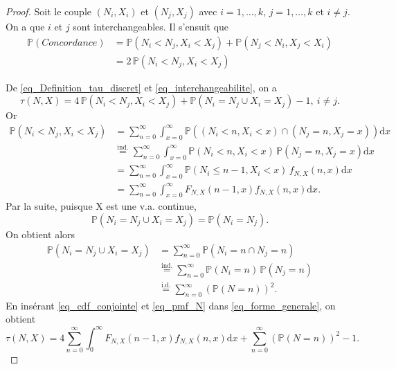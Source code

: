 \documentclass{article}
\begin{document}
	\begin{proof}
		Soit le couple $(N_i, X_i)$ et $(N_j, X_j)$ avec $i=1,\dots,k$, $j=1,\dots,k$ et $i\neq j$. On a que $i$ et $j$ sont interchangeables. Il s'ensuit que
		\begin{align}
			\mathbb{P}(Concordance) 
			&= \mathbb{P}(N_i < N_j, X_i < X_j) + \mathbb{P}(N_j < N_i, X_j < X_i) \nonumber \\
			&= 2 \, \mathbb{P}(N_i < N_j, X_i < X_j)
			\label{eq_interchangeabilite}
		\end{align}
		
		De \eqref{eq_Definition_tau_discret} et \eqref{eq_interchangeabilite}, on a
		\begin{equation}\label{eq_forme_generale}
			\tau (N,X) = 4 \, \mathbb{P}(N_i < N_j, X_i < X_j) + \mathbb{P}(N_i = N_j \cup X_i = X_j) - 1 ,\ i \neq j.
		\end{equation}
		Or
		\begin{align}
			\mathbb{P}(N_i < N_j, X_i < X_j) 
			&= \sum_{n=0}^{\infty} \int_{x=0}^{\infty} \mathbb{P}((N_i < n, X_i < x) \cap (N_j = n, X_j = x))\text{d}x \nonumber \\
			&\overset{\mathrm{ind.}}{=} \sum_{n=0}^{\infty} \int_{x=0}^{\infty} \mathbb{P}(N_i < n, X_i < x) \, \mathbb{P}(N_j = n, X_j = x) \text{d}x \nonumber \\
			&= \sum_{n=0}^{\infty} \int_{x=0}^{\infty} \mathbb{P}(N_i \leq n-1, X_i < x) \, f_{N,X}(n,x) \text{d}x \nonumber \\
			&= \sum_{n=0}^{\infty} \int_{x=0}^{\infty} F_{N,X}(n-1, x) f_{N,X}(n, x) \text{d}x.
			\label{eq_cdf_conjointe}
		\end{align} 
		Par la suite, puisque X est une v.a. continue, $$\mathbb{P}(N_i = N_j \cup X_i = X_j) = \mathbb{P}(N_i = N_j).$$
		On obtient alors
		\begin{align}
			\mathbb{P}(N_i = N_j \cup X_i = X_j) 
			&= \sum_{n=0}^{\infty} \mathbb{P}(N_i = n \cap N_j = n) \nonumber \\
			&\overset{\mathrm{ind.}}{=} \sum_{n=0}^{\infty} \mathbb{P}(N_i = n) \, \mathbb{P}(N_j = n) \nonumber \\
			&\overset{\mathrm{i.d.}}{=} \sum_{n=0}^{\infty} \left(\mathbb{P}(N=n)\right)^2.
			\label{eq_pmf_N}
		\end{align}
		En insérant \eqref{eq_cdf_conjointe} et \eqref{eq_pmf_N} dans \eqref{eq_forme_generale}, on obtient
		$$\tau (N,X) = 4 \sum_{n=0}^{\infty} \int_{0}^{\infty} F_{N,X}(n-1, x) f_{N,X}(n, x) \text{d}x + \sum_{n=0}^{\infty} \left(\mathbb{P}(N=n)\right)^2 - 1.$$ 
	\end{proof}
\end{document}
